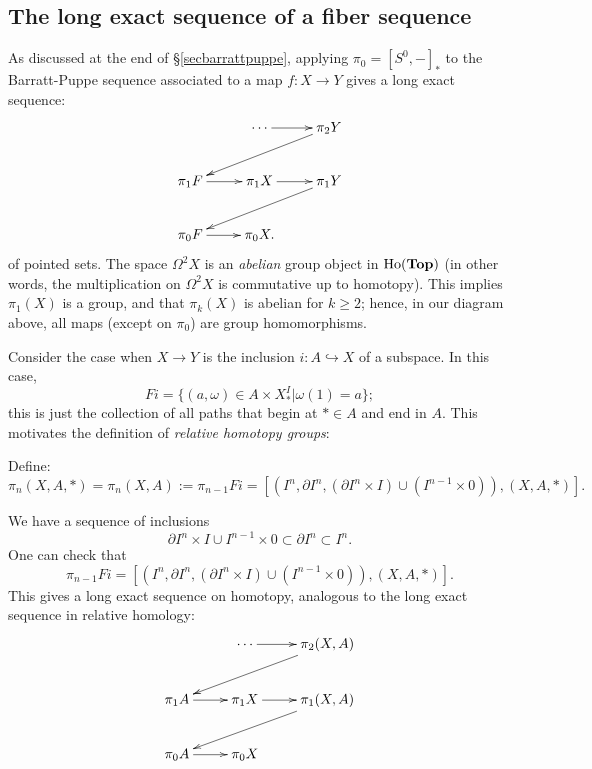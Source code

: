 \subsection{The long exact sequence of a fiber sequence}
As discussed at the end of \S \ref{secbarrattpuppe}, applying $\pi_0 = [S^0,-]_\ast$ to the
Barratt-Puppe sequence associated to a map $f:X\to Y$ gives a long exact sequence:
\begin{equation*}
    \xymatrix{
	& \cdots\ar[r] & \pi_2 Y\ar[dll]\\
	\pi_1 F\ar[r] & \pi_1 X\ar[r] & \pi_1 Y\ar[dll]\\
	\pi_0 F\ar[r] & \pi_0 X. & 
    }
\end{equation*}
of pointed sets.
The space $\Omega^2 X$ is an \emph{abelian} group object in $\mathrm{Ho}(\mathbf{Top})$
(in other words, the multiplication on $\Omega^2 X$ is commutative up to homotopy).
This implies $\pi_1(X)$ is a group, and that $\pi_k(X)$ is abelian for $k\geq 2$;
hence, in our diagram above, all maps (except on $\pi_0$) are group homomorphisms.

Consider the case when $X\to Y$ is the inclusion $i:A\hookrightarrow X$ of a subspace.
In this case,
$$Fi=\{(a,\omega)\in A\times X^I_\ast|\omega(1) = a\};$$
this is just the collection of all paths that begin at $\ast\in A$ and end in $A$.
This motivates the definition of \emph{relative homotopy groups}:
\begin{definition}
    Define: 
    $$\pi_n(X,A,\ast) = \pi_n(X,A) := \pi_{n-1}Fi = [(I^n,\partial I^n,(\partial I^n\times I)\cup (I^{n-1}\times 0)),(X,A,\ast)].$$
\end{definition}
We have a sequence of inclusions
$$\partial I^n\times I\cup I^{n-1}\times 0 \subset \partial I^n \subset I^n.$$
One can check that
$$\pi_{n-1}Fi = [(I^n,\partial I^n,(\partial I^n\times I)\cup (I^{n-1}\times 0)),(X,A,\ast)].$$
This gives a long exact sequence on homotopy, analogous to the long exact sequence in relative homology:
\begin{equation}\label{lexseqhomotopy}
    \xymatrix{
	& \cdots\ar[r] & \pi_2 (X,A)\ar[dll]\\
	\pi_1 A\ar[r] & \pi_1 X\ar[r] & \pi_1 (X,A)\ar[dll]\\
	\pi_0 A\ar[r] & \pi_0 X & 
    }
\end{equation}
